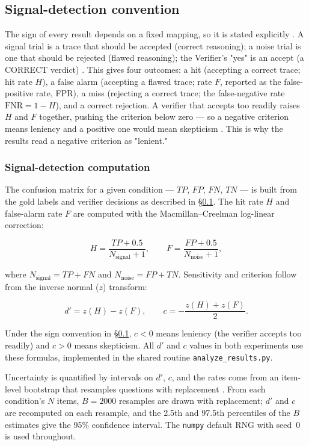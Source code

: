\documentclass[12pt, a4paper, oneside]{report}
\begin{document}
\subsection{Signal-detection convention}\label{sec:sdt-convention}
The sign of every result depends on a fixed mapping, so it is stated explicitly \parencite{Cacioli2026}. 
A signal trial is a trace that should be accepted (correct reasoning); a noise trial is
one that should be rejected (flawed reasoning); the Verifier's "yes" is an accept 
(a CORRECT verdict) \parencite{Cacioli2026}. This gives four outcomes: a hit (accepting a correct trace; hit rate
$H$), a false alarm (accepting a flawed trace; rate $F$, reported as the false-positive 
rate, FPR), a miss (rejecting a correct trace; the false-negative rate $\text{FNR} = 1 - H$),
and a correct rejection. A verifier that accepts too readily raises $H$ and $F$ together,
pushing the criterion below zero — so a negative criterion means leniency and a positive one
would mean skepticism \parencite{Cacioli2026}. This is why the results read a negative criterion as "lenient."


\subsubsection{Signal-detection computation}\label{sec:sdt-computation}

The confusion matrix for a given condition --- $TP$, $FP$, $FN$, $TN$ --- is built from the gold labels and verifier decisions as described in \S\ref{sec:sdt-convention}.  The hit rate $H$ and false-alarm rate $F$ are computed with the Macmillan--Creelman log-linear correction:

\[
H = \frac{TP + 0.5}{N_{\text{signal}} + 1}, \qquad
F = \frac{FP + 0.5}{N_{\text{noise}} + 1},
\]

where $N_{\text{signal}} = TP + FN$ and $N_{\text{noise}} = FP + TN$.  Sensitivity and criterion follow from the inverse normal ($z$) transform:

\[
d' = z(H) - z(F), \qquad
c = -\frac{z(H) + z(F)}{2}.
\]

Under the sign convention in \S\ref{sec:sdt-convention}, $c < 0$ means leniency (the verifier accepts too readily) and $c > 0$ means skepticism.  All $d'$ and $c$ values in both experiments use these formulas, implemented in the shared routine \texttt{analyze\_results.py}.

Uncertainty is quantified by intervals on $d'$, $c$, and the rates come from an item-level bootstrap that resamples questions with replacement \parencite{Cacioli2026}.
From each condition's $N$ items, $B = 2000$ resamples are drawn with replacement; $d'$ and $c$ are recomputed on each resample, and the 2.5th and 97.5th percentiles of the $B$ estimates give the 95\% confidence interval.  The \texttt{numpy} default RNG with seed~0 is used throughout.
\end{document}
